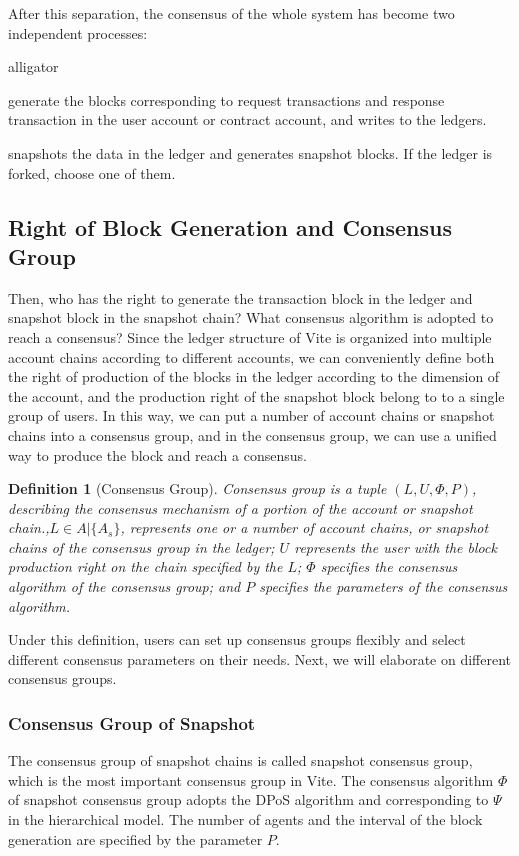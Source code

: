 \documentclass[UTF8,nofonts]{article}
\newtheorem{definition}{Definition}[section]
\begin{document}
\begin{multicols}{2}
After this separation, the consensus of the whole system has become two independent processes:
\begin{labeling}{alligator}
\item [Local consensus] generate the blocks corresponding to request transactions and response transaction in the user account or contract account, and writes to the ledgers.
\item [Global consensus] snapshots the data in the ledger and generates snapshot blocks. If the ledger is forked, choose one of them.
\end{labeling}

\subsection{Right of Block Generation and Consensus Group}
Then, who has the right to generate the transaction block in the ledger and snapshot block in the snapshot chain? What consensus algorithm is adopted to reach a consensus?
Since the ledger structure of Vite is organized into multiple account chains according to different accounts, we can conveniently define both the right of production of the blocks in the ledger according to the dimension of the account, and the production right of the snapshot block belong to to a single group of users. In this way, we can put a number of account chains or snapshot chains into a consensus group, and in the consensus group, we can use a unified way to produce the block and reach a consensus.

\begin{definition}[Consensus Group]
Consensus group is a tuple $(L, U, \Phi, P)$, describing the consensus mechanism of a portion of the account or snapshot chain.,$L \in A \vert \{ A_s \}$,  represents one or a number of account chains, or snapshot chains of the consensus group in the ledger; $U$ represents the user with the block production right on the chain specified by the $L$; $\Phi$ specifies the consensus algorithm of the consensus group; and $P$ specifies the parameters of the consensus algorithm.

\end{definition}

Under this definition, users can set up consensus groups flexibly and select different consensus parameters on their needs. Next, we will elaborate on different consensus groups.

\subsubsection{Consensus Group of Snapshot}
The consensus group of snapshot chains is called snapshot consensus group, which is the most important consensus group in Vite. The consensus algorithm $\Phi$ of snapshot consensus group adopts the DPoS algorithm and corresponding to $\Psi$ in the hierarchical model. The number of agents and the interval of the block generation are specified by the parameter $P$.


\end{multicols}
\end{document}
